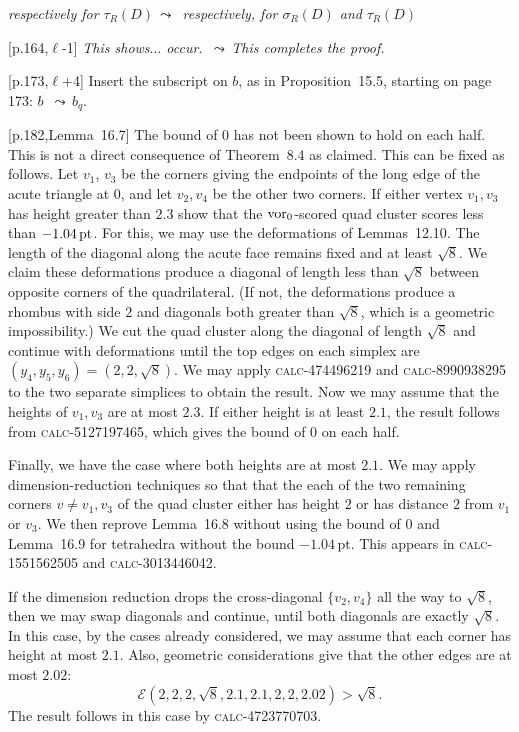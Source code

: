 \documentclass[11pt]{amsart}
\def\op#1{{\text{#1}}}
\def\lto{\ensuremath{\,\leadsto\,}}
\def\line{$\ell$}
\def\text{\hbox}
\def\sz{small} %
\def\rmx{\rm}
\def\calc#1{{\textsc{calc-#1}}}
\def\pt{\mathrm{pt}}
\begin{document}
\begin{\sz}
[p.156,Lemma~13.5,\line+4]
	{\it respectively for $\tau_R(D)$\lto
	respectively, for $\sigma_R(D)$ and }
	$\tau_R(D)$ 

[p.164,\line-1] 
	{\it This shows$\ldots$ occur.
	\lto This completes the proof.}


[p.173,\line+4] {\rmx Insert the subscript on $b$,
as in Proposition~15.5, starting on page 173:}
   $b$ \lto $b_q$.



	
[p.182,Lemma~16.7]  {\rmx The bound of $0$ has not been
shown to hold on each half.  This is not a 
direct consequence
of Theorem~8.4 as claimed.
This can be fixed as follows. 
Let $v_1$, $v_3$ be the corners giving the endpoints of the long edge of the
acute triangle at $0$, and let $v_2,v_4$ be the other two corners.
If either vertex $v_1,v_3$ 
has height greater than $2.3$ show that the $\op{vor}_0$-scored quad cluster scores
less than $-1.04\,\op{pt}$.  
For this, we may use the deformations of Lemmas~12.10.  The length of the diagonal along the acute face remains fixed and at least $\sqrt8$.  We claim these deformations produce a diagonal of length less than $\sqrt8$ between opposite corners of the quadrilateral.  (If not, the deformations produce a rhombus with side $2$ and diagonals both greater than $\sqrt8$, which is a geometric impossibility.)  We cut the quad cluster along the diagonal of length $\sqrt8$ and continue with deformations until the top edges on each simplex are $(y_4,y_5,y_6)=(2,2,\sqrt8)$.  We may apply \calc{474496219} and \calc{8990938295} to the two separate simplices to obtain the result.}
%
Now we may assume that the heights of $v_1,v_3$ are at most $2.3$.  If either
height is at least $2.1$, the result follows from \calc{5127197465}, which gives
the bound of $0$ on each half.

Finally, we have the case where both heights are at most $2.1$.  We may apply
dimension-reduction techniques so that that the each of the two
remaining corners $v\ne v_1,v_3$
of the quad cluster either has height $2$ or has distance $2$ from $v_1$ or $v_3$.
We then reprove Lemma~16.8 without using the bound of $0$ and Lemma~16.9 for tetrahedra without the bound  $-1.04\,\pt$.  This appears in \calc{1551562505} and \calc{3013446042}.  

If the dimension reduction drops the cross-diagonal $\{v_2,v_4\}$ all the way to $\sqrt8$, then we may swap diagonals and continue, until both diagonals are exactly $\sqrt8$.  In this case, by the cases already considered, we may assume that each corner has height at most $2.1$.  Also, geometric considerations give that the other edges are at most $2.02$:
  $$
  {\mathcal E}(2,2,2,\sqrt8,2.1,2.1,2,2,2.02) >\sqrt8.
  $$
The result follows in this case by \calc{4723770703}.


\end{\sz}
\end{document}
